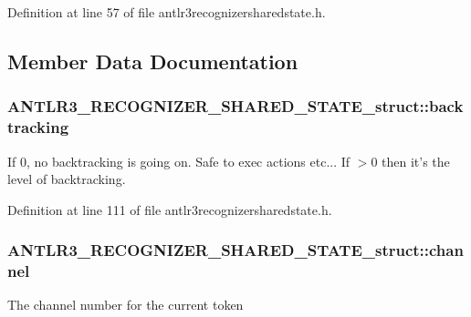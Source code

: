 Definition at line 57 of file antlr3recognizersharedstate.\-h.



\subsection{Member Data Documentation}
\hypertarget{struct_a_n_t_l_r3___r_e_c_o_g_n_i_z_e_r___s_h_a_r_e_d___s_t_a_t_e__struct_ab1ca55111efc551cf9e0446839a70b64}{
\subsubsection[{backtracking}]{ A\-N\-T\-L\-R3\-\_\-\-R\-E\-C\-O\-G\-N\-I\-Z\-E\-R\-\_\-\-S\-H\-A\-R\-E\-D\-\_\-\-S\-T\-A\-T\-E\-\_\-struct\-::backtracking}}\label{struct_a_n_t_l_r3___r_e_c_o_g_n_i_z_e_r___s_h_a_r_e_d___s_t_a_t_e__struct_ab1ca55111efc551cf9e0446839a70b64}
If 0, no backtracking is going on. Safe to exec actions etc... If $>$0 then it's the level of backtracking. 

Definition at line 111 of file antlr3recognizersharedstate.\-h.

\hypertarget{struct_a_n_t_l_r3___r_e_c_o_g_n_i_z_e_r___s_h_a_r_e_d___s_t_a_t_e__struct_a3c3e5647d641914d1d6a5d6788b46810}{
\subsubsection[{channel}]{ A\-N\-T\-L\-R3\-\_\-\-R\-E\-C\-O\-G\-N\-I\-Z\-E\-R\-\_\-\-S\-H\-A\-R\-E\-D\-\_\-\-S\-T\-A\-T\-E\-\_\-struct\-::channel}}\label{struct_a_n_t_l_r3___r_e_c_o_g_n_i_z_e_r___s_h_a_r_e_d___s_t_a_t_e__struct_a3c3e5647d641914d1d6a5d6788b46810}
The channel number for the current token 

